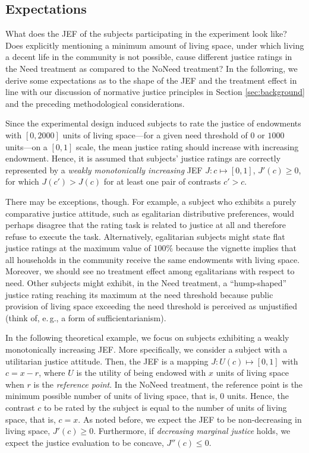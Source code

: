 \documentclass[12pt]{scrartcl}
\begin{document}
\subsection{Expectations}\label{sec:expectations}
What does the JEF of the subjects participating in the experiment look like?
Does explicitly mentioning a minimum amount of living space, under which living a decent life in the community is not possible, cause different justice ratings in the Need treatment as compared to the NoNeed treatment?
In the following, we derive some expectations as to the shape of the JEF and the treatment effect in line with our discussion of normative justice principles in Section \ref{sec:background} and the preceding methodological considerations.

Since the experimental design induced subjects to rate the justice of endowments with $[0,2000]$ units of living space---for a given need threshold of $0$ or $1000$ units---on a $[0,1]$ scale, the mean justice rating should increase with increasing endowment.
Hence, it is assumed that subjects' justice ratings are correctly represented by a \textit{weakly monotonically increasing} JEF $J:c\mapsto[0,1]$, $J'(c)\ge 0$, for which $J(c')>J(c)$ for at least one pair of contrasts $c'>c$.

There may be exceptions, though.
For example, a subject who exhibits a purely comparative justice attitude, such as egalitarian distributive preferences, would perhaps disagree that the rating task is related to justice at all and therefore refuse to execute the task.
Alternatively, egalitarian subjects might state flat justice ratings at the maximum value of $100\%$ because the vignette implies that all households in the community receive the same endowments with living space.
Moreover, we should see no treatment effect among egalitarians with respect to need.
Other subjects might exhibit, in the Need treatment, a ``hump-shaped'' justice rating reaching its maximum at the need threshold because public provision of living space exceeding the need threshold is perceived as unjustified (think of, e.\,g., a form of sufficientarianism).

In the following theoretical example, we focus on subjects exhibiting a weakly monotonically increasing JEF.
More specifically, we consider a subject with a utilitarian justice attitude.
Then, the JEF is a mapping $J:U(c)\mapsto [0,1]$ with $c=x-r$, where $U$ is the utility of being endowed with $x$ units of living space when $r$ is the \textit{reference point}.
In the NoNeed treatment, the reference point is the minimum possible number of units of living space, that is, $0$ units.
Hence, the contrast $c$ to be rated by the subject is equal to the number of units of living space, that is, $c=x$.
As noted before, we expect the JEF to be non-decreasing in living space, $J'(c)\ge 0$.
Furthermore, if \textit{decreasing marginal justice} holds, we expect the justice evaluation to be concave, $J''(c)\le 0$.
\end{document}
